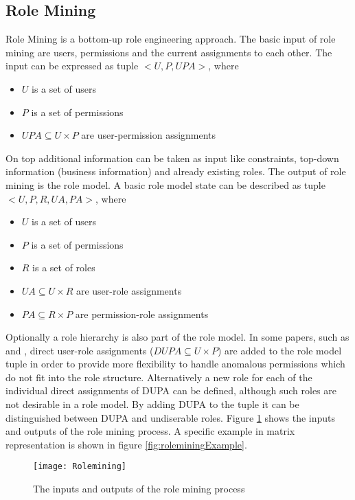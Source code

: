     \subsection{Role Mining}
    Role Mining is a bottom-up role engineering approach. The basic input of role mining are users, permissions and the current assignments to each other. The input can be expressed as tuple $<U,P,UPA>$, where
    \begin{itemize}[noitemsep,topsep=0pt,parsep=0pt,partopsep=0pt]
        \item \textbf{$U$} is a set of users
        \item \textbf{$P$} is a set of permissions
        \item \textbf{$UPA \subseteq U \times P$} are user-permission assignments
    \end{itemize}
    On top additional information can be taken as input like constraints, top-down information (business information) and already existing roles. The output of role mining is the role model. A basic role model state can be described as tuple $<U,P,R,UA,PA>$, where
    \begin{itemize}[noitemsep,topsep=0pt,parsep=0pt,partopsep=0pt]
        \item \textbf{$U$} is a set of users
        \item \textbf{$P$} is a set of permissions
        \item \textbf{$R$} is a set of roles
        \item \textbf{$UA \subseteq U \times R$} are user-role assignments
        \item \textbf{$PA \subseteq R \times P$} are permission-role assignments
    \end{itemize}
    Optionally a role hierarchy is also part of the role model. In some papers, such as \cite{Molloy} and \cite{DuChang}, direct user-role assignments ($DUPA \subseteq U \times P$) are added to the role model tuple in order to provide more flexibility to handle anomalous permissions which do not fit into the role structure. Alternatively a new role for each of the individual direct assignments of DUPA can be defined, although such roles are not desirable in a role model. By adding DUPA to the tuple it can be distinguished between DUPA and undiserable roles. Figure \ref{fig:rolemining} shows the inputs and outputs of the role mining process.  A specific example in matrix representation is shown in figure \ref{fig:roleminingExample}.
    \begin{figure}[H]
        \centering
        \texttt{[image: Rolemining]}
        \caption{The inputs and outputs of the role mining process}
        \label{fig:rolemining}
    \end{figure}
    
